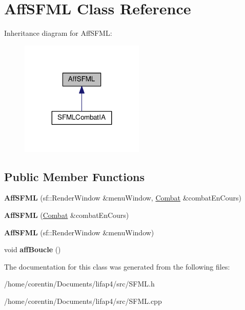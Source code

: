 \hypertarget{class_aff_s_f_m_l}{}\section{Aff\+S\+F\+ML Class Reference}
\label{class_aff_s_f_m_l}


Inheritance diagram for Aff\+S\+F\+ML\+:
\nopagebreak
\begin{figure}[H]
\begin{center}
\leavevmode
\includegraphics[width=167pt]{class_aff_s_f_m_l__inherit__graph}
\end{center}
\end{figure}
\subsection*{Public Member Functions}
\begin{DoxyCompactItemize}
\item 
\mbox{\label{class_aff_s_f_m_l_a4a0e2d499d276524b651d77678597a06}} 
{\bfseries Aff\+S\+F\+ML} (sf\+::\+Render\+Window \&menu\+Window, \hyperlink{class_combat}{Combat} \&combat\+En\+Cours)
\item 
\mbox{\label{class_aff_s_f_m_l_abe47621ba363abdaf4e68cbda27b9017}} 
{\bfseries Aff\+S\+F\+ML} (\hyperlink{class_combat}{Combat} \&combat\+En\+Cours)
\item 
\mbox{\label{class_aff_s_f_m_l_a641895d24739ca5f338ddc2fe3f912d7}} 
{\bfseries Aff\+S\+F\+ML} (sf\+::\+Render\+Window \&menu\+Window)
\item 
\mbox{\label{class_aff_s_f_m_l_add94bec75d1075827df1722e3e182518}} 
void {\bfseries aff\+Boucle} ()
\end{DoxyCompactItemize}


The documentation for this class was generated from the following files\+:\begin{DoxyCompactItemize}
\item 
/home/corentin/\+Documents/lifap4/src/S\+F\+M\+L.\+h\item 
/home/corentin/\+Documents/lifap4/src/S\+F\+M\+L.\+cpp\end{DoxyCompactItemize}
